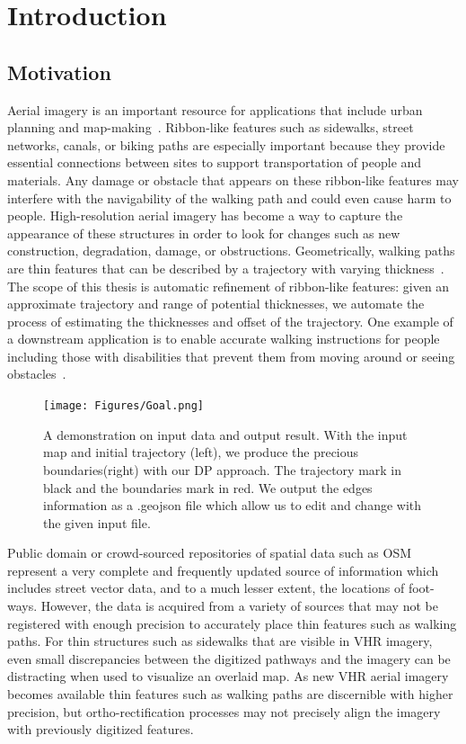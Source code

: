 \chapter{Introduction}

\section{Motivation}
Aerial imagery is an important resource for applications that include urban planning and map-making~\cite{5523977}. 
Ribbon-like features such as sidewalks, street networks, canals, or biking paths are especially important because they provide essential connections between sites to support transportation of people and materials. 
Any damage or obstacle that appears on these ribbon-like features may interfere with the navigability of the walking path and could even cause harm to people.
High-resolution aerial imagery has become a way to capture the appearance of these structures in order to look for changes such as new construction, degradation, damage, or obstructions. 
Geometrically, walking paths are thin features that can be described by a trajectory with varying thickness~\cite{10.1007/11744078_9}. 
The scope of this thesis is automatic refinement of ribbon-like features: given an approximate trajectory and range of potential thicknesses, we automate the process of estimating the thicknesses and offset of the trajectory. 
One example of a downstream application is to enable accurate walking instructions for people including those with disabilities that prevent them from moving around or seeing obstacles~\cite{ZOU2012227}. 

\begin{figure}
    \centering
    \texttt{[image: Figures/Goal.png]}
    \caption[Objective Demonstration]{A demonstration  on input data and output result. With the input map and initial trajectory (left), we produce the precious boundaries(right) with our \ac{DP} approach. The trajectory mark in black and the boundaries mark in red. We output the edges information as a .geojson file which allow us to edit and change with the given input file.}
    \label{fig:goal}
\end{figure}


Public domain or crowd-sourced repositories of spatial data such as \ac{OSM}~\cite{OpenStreetMap} represent a very complete and frequently updated source of information which includes street vector data, and to a much lesser extent, the locations of foot-ways.
However, the data is acquired from a variety of sources that may not be registered with enough precision to accurately place thin features such as walking paths. For thin structures such as sidewalks that are visible in \ac{VHR} imagery, even small discrepancies between the digitized pathways and the imagery can be distracting when used to visualize an overlaid map.
As new \ac{VHR} aerial imagery becomes available thin features such as walking paths are discernible with higher precision, but ortho-rectification processes may not precisely align the imagery with previously digitized features. 

